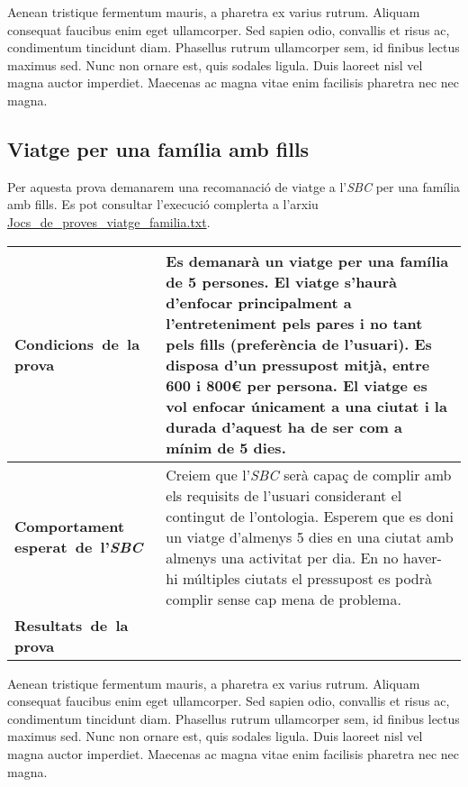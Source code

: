 \documentclass[11pt,a4paper]{article}
\begin{document}
Aenean tristique fermentum mauris, a pharetra ex varius rutrum. Aliquam consequat faucibus enim eget ullamcorper. Sed sapien odio, convallis et risus ac, condimentum tincidunt diam. Phasellus rutrum ullamcorper sem, id finibus lectus maximus sed. Nunc non ornare est, quis sodales ligula. Duis laoreet nisl vel magna auctor imperdiet. Maecenas ac magna vitae enim facilisis pharetra nec nec magna.


\subsection{Viatge per una família amb fills}
Per aquesta prova demanarem una recomanació de viatge a l'\emph{SBC} per una família amb fills. Es pot consultar l'execució complerta a l'arxiu \url{Jocs_de_proves_viatge_familia.txt}. \\

\noindent
\begin{tabular}{|p{}|p{}|}
\hline
\textbf{\mbox{Condicions de la} \mbox{prova}} & Es demanarà un viatge per una família de 5 persones. El viatge s'haurà d'enfocar principalment a l'entreteniment pels pares i no tant pels fills (preferència de l'usuari). Es disposa d'un pressupost mitjà, entre 600 i 800\euro{} per persona. El viatge es vol enfocar únicament a una ciutat i la durada d'aquest ha de ser com a mínim de 5 dies. \\
\hline
\textbf{Comportament \mbox{esperat de l'\emph{SBC}}} & Creiem que l'\emph{SBC} serà capaç de complir amb els requisits de l'usuari considerant el contingut de l'ontologia. Esperem que es doni un viatge d'almenys 5 dies en una ciutat amb almenys una activitat per dia. En no haver-hi múltiples ciutats el pressupost es podrà complir sense cap mena de problema. \\
\hline
\textbf{\mbox{Resultats de la} \mbox{prova}} & \\
\hline
\end{tabular}
\medskip

Aenean tristique fermentum mauris, a pharetra ex varius rutrum. Aliquam consequat faucibus enim eget ullamcorper. Sed sapien odio, convallis et risus ac, condimentum tincidunt diam. Phasellus rutrum ullamcorper sem, id finibus lectus maximus sed. Nunc non ornare est, quis sodales ligula. Duis laoreet nisl vel magna auctor imperdiet. Maecenas ac magna vitae enim facilisis pharetra nec nec magna.
\end{document}
